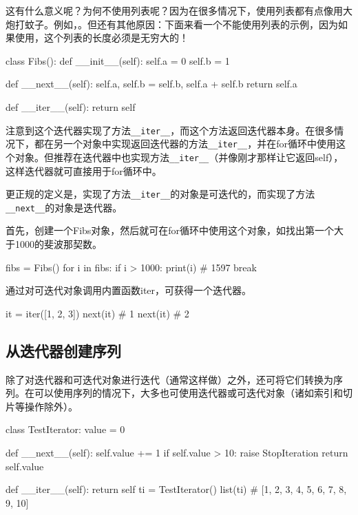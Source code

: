 这有什么意义呢？为何不使用列表呢？因为在很多情况下，使用列表都有点像用大炮打蚊子。例如，。但还有其他原因：下面来看一个不能使用列表的示例，因为如果使用，这个列表的长度必须是无穷大的！

\begin{pyc}
class Fibs():
    def __init__(self):
        self.a = 0
        self.b = 1

    def __next__(self):
        self.a, self.b = self.b, self.a + self.b
        return self.a

    def __iter__(self):
        return self
\end{pyc}

注意到这个迭代器实现了方法\verb|__iter__|，而这个方法返回迭代器本身。在很多情况下，都在另一个对象中实现返回迭代器的方法\verb|__iter__|，并在for循环中使用这个对象。但推荐在迭代器中也实现方法\verb|__iter__|（并像刚才那样让它返回self），这样迭代器就可直接用于for循环中。

\begin{tcolorbox}[colback=red!20]
更正规的定义是，实现了方法\verb|__iter__|的对象是可迭代的，而实现了方法\verb|__next__|的对象是迭代器。
\end{tcolorbox}
首先，创建一个Fibs对象，然后就可在for循环中使用这个对象，如找出第一个大于1000的斐波那契数。
\begin{pyc}
fibs = Fibs()
for i in fibs:
    if i > 1000:
        print(i)  # 1597
        break
\end{pyc}

\begin{tcolorbox}
通过对可迭代对象调用内置函数iter，可获得一个迭代器。
\begin{pyc}
it = iter([1, 2, 3])
next(it)  # 1
next(it)  # 2
\end{pyc}
\end{tcolorbox}
\subsection{从迭代器创建序列}
除了对迭代器和可迭代对象进行迭代（通常这样做）之外，还可将它们转换为序列。在可以使用序列的情况下，大多也可使用迭代器或可迭代对象（诸如索引和切片等操作除外）。
\begin{pyc}
class TestIterator:
    value = 0

    def __next__(self):
        self.value += 1
        if self.value > 10:
            raise StopIteration
        return self.value

    def __iter__(self):
        return self
ti = TestIterator()
list(ti)  # [1, 2, 3, 4, 5, 6, 7, 8, 9, 10]
\end{pyc}
